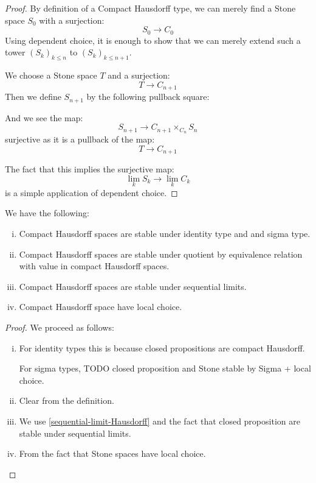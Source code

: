 \begin{proof}
By definition of a Compact Hausdorff type, we can merely find a Stone space $S_0$ with a surjection:
\[S_0\to C_0\]
Using dependent choice, it is enough to show that we can merely extend such a tower $(S_k)_{k\leq n}$ to $(S_k)_{k\leq n+1}$.

We choose a Stone space $T$ and a surjection:
\[T \to C_{n+1} \]
Then we define $S_{n+1}$ by the following pullback square:
\begin{center}
\end{center}
And we see the map:
\[S_{n+1} \to C_{n+1}\times_{C_n} S_n\] 
surjective as it is a pullback of the map:
\[T\to C_{n+1}\]

The fact that this implies the surjective map:
\[\lim_kS_k \to \lim_k C_k\]
is a simple application of dependent choice.
\end{proof}

\begin{theorem}
We have the following:
\begin{enumerate}[(i)]
\item Compact Hausdorff spaces are stable under identity type and and sigma type.
\item Compact Hausdorff spaces are stable under quotient by equivalence relation with value in compact Hausdorff spaces.
\item Compact Hausdorff spaces are stable under sequential limits.
\item Compact Hausdorff space have local choice.
\end{enumerate}
\end{theorem}

\begin{proof}
We proceed as follows:
\begin{enumerate}[(i)]
\item For identity types this is because closed propositions are compact Hausdorff.

For sigma types, TODO closed proposition and Stone stable by Sigma + local choice.

\item Clear from the definition.

\item We use \cref{sequential-limit-Hausdorff} and the fact that closed proposition are stable under sequential limits.

\item From the fact that Stone spaces have local choice.
\end{enumerate}
\end{proof}
